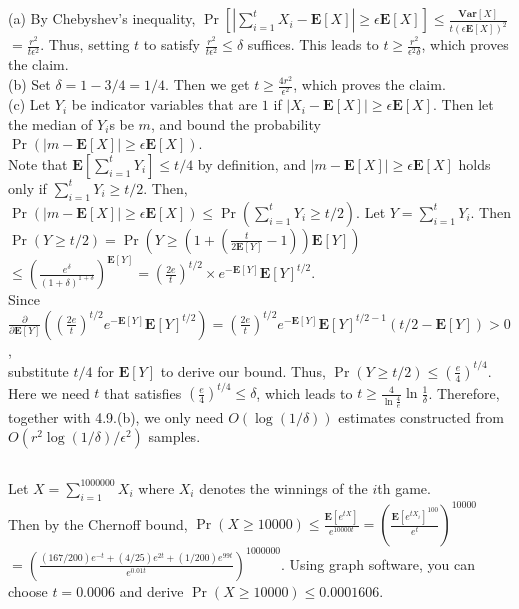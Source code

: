 \documentclass{article}
\begin{document}
\subsection{}
(a) By Chebyshev's inequality, $\Pr[|\sum\limits_{i=1}^tX_i-\textbf{E}[X]|\geq\epsilon\textbf{E}[X]]\leq\frac{\textbf{Var}[X]}{t(\epsilon\textbf{E}[X])^2}$
$=\frac{r^2}{t\epsilon^2}$. Thus, setting $t$ to satisfy $\frac{r^2}{t\epsilon^2}\leq \delta$ suffices.
This leads to $t \geq \frac{r^2}{\epsilon^2\delta}$, which proves the claim.\\
(b) Set $\delta=1-3/4=1/4$. Then we get $t \geq \frac{4r^2}{\epsilon^2}$, which proves the claim.\\
(c) Let $Y_i$ be indicator variables that are $1$ if $|X_i-\textbf{E}[X]|\geq\epsilon\textbf{E}[X]$. Then let the median of $Y_i$s be $m$, and bound the probability $\Pr(|m-\textbf{E}[X]|\geq\epsilon\textbf{E}[X])$.\\
Note that $\textbf{E}[\sum\limits_{i=1}^tY_i]\leq t/4$ by definition, and $|m-\textbf{E}[X]|\geq\epsilon\textbf{E}[X]$ holds only if $\sum\limits_{i=1}^tY_i \geq t/2$.
Then, $\Pr(|m-\textbf{E}[X]|\geq\epsilon\textbf{E}[X]) \leq \Pr\left(\sum\limits_{i=1}^tY_i \geq t/2\right)$. Let $Y=\sum\limits_{i=1}^tY_i$.
Then $\Pr(Y\geq t/2)=\Pr\left(Y\geq(1+(\frac{t}{2\textbf{E}[Y]}-1))\textbf{E}[Y]\right)$\\
$\leq \left(\frac{e^\delta}{(1+\delta)^{1+\delta}}\right)^{\textbf{E}[Y]}=(\frac{2e}{t})^{t/2}\times e^{-\textbf{E}[Y]}\textbf{E}[Y]^{t/2}$.\\
Since $\frac{\partial}{\partial \textbf{E}[Y]}\left( (\frac{2e}{t})^{t/2}e^{-\textbf{E}[Y]}\textbf{E}[Y]^{t/2} \right)=(\frac{2e}{t})^{t/2} e^{-\textbf{E}[Y]}\textbf{E}[Y]^{t/2-1}(t/2-\textbf{E}[Y])> 0$,\\
substitute $t/4$ for $\textbf{E}[Y]$ to derive our bound. Thus, $\Pr(Y\geq t/2) \leq (\frac{e}{4})^{t/4}$.\\
Here we need $t$ that satisfies $(\frac{e}{4})^{t/4} \leq \delta$, which leads to $t \geq \frac{4}{\ln \frac{4}{e}}\ln \frac{1}{\delta}$.
Therefore, together with 4.9.(b), we only need $O(\log(1/\delta))$ estimates constructed from $O(r^2\log(1/\delta)/\epsilon^2)$ samples.
\subsection{}
Let $X=\sum\limits_{i=1}^{1000000}X_i$ where $X_i$ denotes the winnings of the $i$th game.\\
Then by the Chernoff bound, $\Pr(X\geq10000) \leq \frac{\textbf{E}[e^{tX}]}{e^{10000t}}=\left(\frac{\textbf{E}[e^{tX_i}]^{100}}{e^{t}}\right)^{10000}$\\
$=\left(\frac{(167/200)e^{-t}+(4/25)e^{2t}+(1/200)e^{99t}}{e^{0.01t}}\right)^{1000000}$.
Using graph software, you can choose $t=0.0006$ and derive $\Pr(X\geq10000) \leq 0.0001606$.
\end{document}
